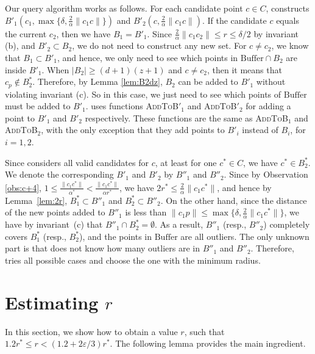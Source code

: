 \documentclass[envcountsame]{cls/cccg15}
\newcommand{\dz}{(d + 1)(z + 1)}
\newcommand{\Buffer}{\ensuremath{\text{Buffer}}}
\newcommand{\textproc}{\textsc}
\newcommand{\len}[1]{\|{#1}\|}
\newcommand{\radius}[1]{\frac{2}{\alpha} \len{c_1 #1}}
\newcommand{\lee}{\leqslant}
\newcommand{\gee}{\geqslant}
\renewcommand{\leq}{\lee}
\renewcommand{\le}{\lee}
\renewcommand{\geq}{\gee}
\newcommand{\eps}{\varepsilon}
\begin{document}
\noindent
Our query algorithm works as follows. 
For each candidate point $c \in C$,  
constructs $B'_1(c_1, \max \{\delta, \radius{c} \})$ and $B'_2(c, \radius{c})$. 
If the candidate $c$ equals the current $c_2$, then we have $B_1 = B'_1$. 
Since $\radius{c_2} \leq r \leq \delta/2$ by invariant (b), and $B'_2 \subset B_2$,
we do not need to construct any new set. 
For $c \neq c_2$, we know that $B_1 \subset B'_1$, and hence,
we only need to see which points in $\Buffer \cap B_2$ are inside $B'_1$.
When $|B_2| \geq \dz$ and $c \neq c_2$, then it means that $c_p \not \in B_2^*$. 
Therefore, by Lemma \ref{lem:B2dz}, $B_2$ can be added to $B'_1$ without violating invariant (c). 
So in this case, we just need to see which points of $\Buffer$ must be added to $B'_1$. 
 uses functions \textproc{AddToB$'_1$} and \textproc{AddToB$'_2$} 
for adding a point to $B'_1$ and $B'_2$ respectively. 
These functions are the same as \textproc{AddToB$_1$} and \textproc{AddToB$_2$},
with the only exception that they add points to $B'_i$ instead of $B_i$, for $i = 1, 2$.

Since  considers all valid candidates for $c$, 
at least for one $c^* \in C$, we have $c^* \in B_2^*$. 
We denote the corresponding $B'_1$ and $B'_2$ by $B''_1$ and $B''_2$. 
Since by Observation \ref{obs:c+4},
$1 \leq \frac{\len{c_1 c^*}}{\alpha^*} < \frac{\len {c_1 c^*}}{\alpha r^*}$, 
we have $2r^* \leq \radius{c^*}$, and hence
by Lemma~\ref{lem:2r}, $B^*_1 \subset B''_1$ and $B^*_2 \subset B''_2$.
On the other hand, since the distance of the new points added to $B''_1$ 
is less than $\len{c_1 p} \leq \max \{\delta, \radius{c^*} \}$, 
we have by invariant~(c) that  $B''_1 \cap B_2^* = \emptyset$.
As a result, $B''_1$ (resp., $B''_2$) completely covers $B_1^*$  (resp., $B_2^*$), 
and the points in $\Buffer$ are all outliers.
The only unknown part is that  does not know how many outliers are in $B''_1$ and $B''_2$.
Therefore,  tries all possible cases and choose the one with the minimum radius.





\section{Estimating $r$}
\label{sec:estimate}

In this section, we show how to obtain a value $r$,
such that $1.2r^* \le r < (1.2 + 2\eps/3)r^*$.
The following lemma provides the main ingredient.
\end{document}
